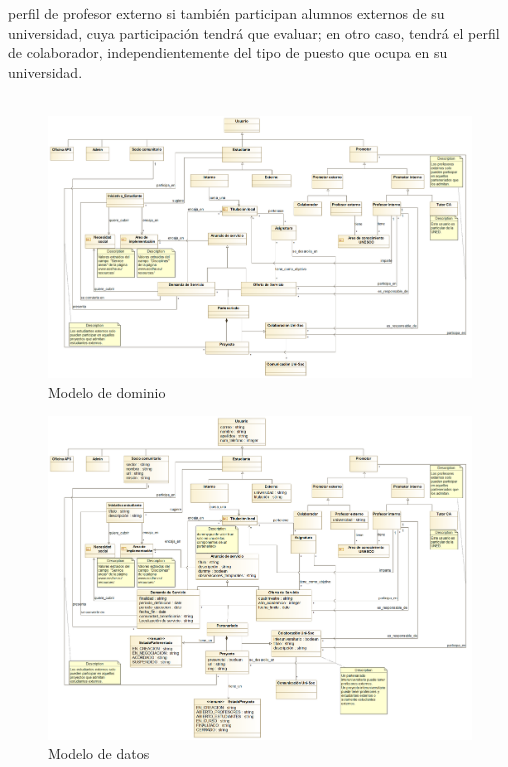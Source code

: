 \documentclass[11pt]{book}
\begin{document}
	perfil de profesor externo si también participan alumnos externos de su
	universidad, cuya participación tendrá que evaluar; en otro caso, tendrá
	el perfil de colaborador, independientemente del tipo de puesto que
	ocupa en su universidad.\\\\
	\begin{landscape}
		\begin{figure}[p]
			\includegraphics[scale=0.4]{mdominio}
			\caption{Modelo de dominio}
			\label{fig:dominio}
		\end{figure}
	\end{landscape}
	\begin{landscape}
		\begin{figure}[p]
			\includegraphics[scale=0.35]{mdatos}
			\caption{Modelo de datos}
			\label{fig:datos}
		\end{figure}
	\end{landscape}
	
\end{document}
